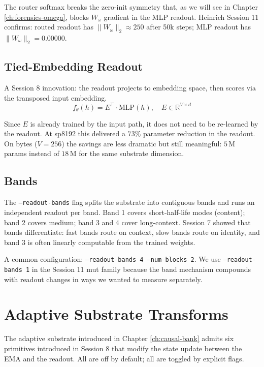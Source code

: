 \documentclass[11pt,openany]{book}
\theoremstyle{definition}
\theoremstyle{plain}
\newcommand{\omegaproj}{W_\omega}
\begin{document}
The router softmax breaks the zero-init symmetry that, as we will see in
Chapter \ref{ch:forensics-omega}, blocks $\omegaproj$ gradient in the MLP
readout. Heinrich Session 11 confirms: routed readout has $\|\omegaproj\|_2
\approx 250$ after 50k steps; MLP readout has $\|\omegaproj\|_2 = 0.00000$.

\section{Tied-Embedding Readout}

A Session 8 innovation: the readout projects to embedding space, then
scores via the transposed input embedding.
\begin{equation}
  f_\theta(h) = E^\top \cdot \mathrm{MLP}(h),
  \quad E \in \mathbb{R}^{V \times d}
\end{equation}

Since $E$ is already trained by the input path, it does not need to be
re-learned by the readout. At sp8192 this delivered a $73\%$ parameter
reduction in the readout. On bytes ($V = 256$) the savings are less
dramatic but still meaningful: $5$\,M params instead of $18$\,M for the
same substrate dimension.

\section{Bands}

The \texttt{--readout-bands} flag splits the substrate into contiguous
bands and runs an independent readout per band. Band 1 covers
short-half-life modes (content); band 2 covers medium; band 3 and 4
cover long-context. Session 7 showed that bands differentiate: fast
bands route on context, slow bands route on identity, and band 3 is often
linearly computable from the trained weights.

A common configuration: \texttt{--readout-bands 4 --num-blocks 2}. We use
\texttt{--readout-bands 1} in the Session 11 mut family because the band
mechanism compounds with readout changes in ways we wanted to measure
separately.

\chapter{Adaptive Substrate Transforms}
\label{ch:adaptive-transforms}

The adaptive substrate introduced in Chapter \ref{ch:causal-bank} admits
six primitives introduced in Session 8 that modify the state update
between the EMA and the readout. All are off by default; all are toggled
by explicit flags.
\end{document}
